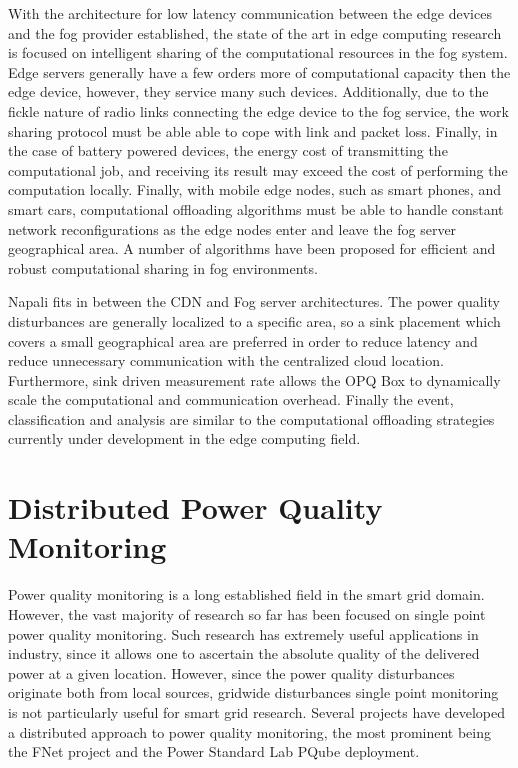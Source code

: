 With the architecture for low latency communication between the edge devices and the fog provider established, the state of the art in edge computing research is focused on intelligent sharing of the computational resources in the fog system. Edge servers generally have a few orders more of computational capacity then the edge device, however, they service many such devices. Additionally, due to the fickle nature of radio links connecting the edge device to the fog service, the work sharing protocol must be able able to cope with link and packet loss. Finally, in the case of battery powered devices, the energy cost of transmitting the computational job, and receiving its result may exceed the cost of performing the computation locally. Finally, with mobile edge nodes, such as smart phones, and smart cars, computational offloading algorithms must be able to handle constant network reconfigurations as the edge nodes enter and leave the fog server geographical area. A number of algorithms have been proposed for efficient and robust computational sharing in fog environments. \cite{oueis2015fog} \cite{wang2015mobiscud} \cite{wang2013mobile}

Napali fits in between the CDN and Fog server architectures. The power quality disturbances are generally localized to a specific area, so a sink placement which covers a small geographical area are preferred in order to reduce latency and reduce unnecessary communication with the centralized cloud location. Furthermore, sink driven measurement rate allows the OPQ Box to dynamically scale the computational and communication overhead. Finally the event, classification and analysis are similar to the computational offloading strategies currently under development in the edge computing field.

\section{Distributed Power Quality Monitoring}

Power quality monitoring is a long established field in the smart grid domain. However, the vast majority of research so far has been focused on single point power quality monitoring.\cite{silva2017development} Such research has extremely useful applications in industry, since it allows one to ascertain the absolute quality of the delivered power at a given location. However, since the power quality disturbances originate both from local sources, gridwide disturbances single point monitoring is not particularly useful for smart grid research. Several projects have developed a distributed approach to power quality monitoring, the most prominent being the FNet project and the Power Standard Lab PQube deployment. 

